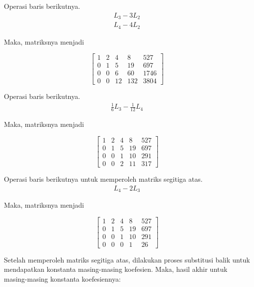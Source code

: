 Operasi baris berikutnya.
\begin{align*}
	L_3 - 3L_2 \\
	L_4 - 4L_2
\end{align*}

Maka, matriksnya menjadi

\begin{center}
	\setlength\arraycolsep{15pt}
	\[
	\begin{bmatrix}
			1 	& 2 	& 4 	& 8 		& 527 		\\[1em]
			0 	& 1 	& 5 	& 19 		& 697			\\[1em]
			0 	& 0 	& 6 	& 60 		& 1746		\\[1em]
			0 	& 0 	& 12 	& 132 	& 3804
	\end{bmatrix}
	\]
\end{center}

Operasi baris berikutnya.
\begin{align*}
	\frac{1}{6}L_3 - \frac{1}{12}L_4
\end{align*}

Maka, matriksnya menjadi

\begin{center}
	\setlength\arraycolsep{15pt}
	\[
	\begin{bmatrix}
			1 	& 2 	& 4 	& 8 		& 527 	\\[1em]
			0 	& 1 	& 5 	& 19 		& 697		\\[1em]
			0 	& 0 	& 1 	& 10 		& 291		\\[1em]
			0 	& 0 	& 2 	& 11 		& 317
	\end{bmatrix}
	\]
\end{center}

Operasi baris berikutnya untuk memperoleh matriks segitiga atas.
\begin{align*}
	L_4 - 2L_3
\end{align*}

Maka, matriksnya menjadi

\begin{center}
	\setlength\arraycolsep{15pt}
	\[
	\begin{bmatrix}
			1 	& 2 	& 4 	& 8 		& 527 	\\[1em]
			0 	& 1 	& 5 	& 19 		& 697		\\[1em]
			0 	& 0 	& 1 	& 10 		& 291		\\[1em]
			0 	& 0 	& 0 	& 1 		& 26
	\end{bmatrix}
	\]
\end{center}

Setelah memperoleh matriks segitiga atas, dilakukan proses substitusi balik untuk mendapatkan konstanta masing-masing koefesien. Maka, hasil akhir untuk masing-masing konstanta koefesiennya:

